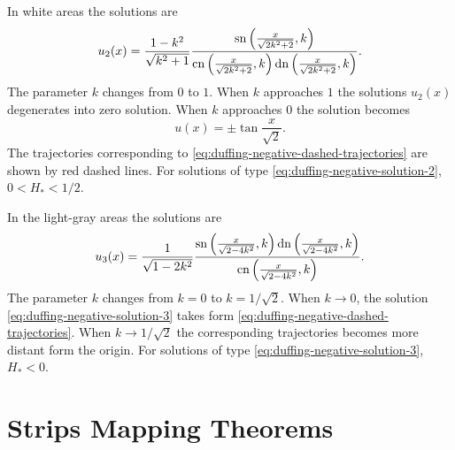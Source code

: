 In white areas the solutions are
\begin{equation}
	u_2(x) = \frac{1 - k^2}{\sqrt{k^2 + 1}} \frac{\mathop\mathrm{sn} \left( \frac{x}{\sqrt{2k^2 + 2}}, k \right)}{\mathrm{cn} \left( \frac{x}{\sqrt{2k^2 + 2}}, k \right) \mathop\mathrm{dn} \left( \frac{x}{\sqrt{2k^2 + 2}}, k \right)}.
\label{eq:duffing-negative-solution-2}
\end{equation}
The parameter $k$ changes from $0$ to $1$.
When $k$ approaches $1$ the solutions $u_2(x)$ degenerates into zero solution.
When $k$ approaches $0$ the solution becomes
\begin{equation}
	u(x) = \pm \tan \frac{x}{\sqrt{2}}.
\label{eq:duffing-negative-dashed-trajectories}
\end{equation}
The trajectories corresponding to \eqref{eq:duffing-negative-dashed-trajectories} are shown by red dashed lines.
For solutions of type \eqref{eq:duffing-negative-solution-2}, $0 < H_* < 1/2$.

In the light-gray areas the solutions are
\begin{equation}
	u_3(x) = \frac{1}{\sqrt{1 - 2k^2}} \frac{\mathop\mathrm{sn} \left( \frac{x}{\sqrt{2 - 4k^2}}, k \right) \mathop\mathrm{dn} \left( \frac{x}{\sqrt{2 - 4k^2}}, k \right)}{\mathrm{cn} \left( \frac{x}{\sqrt{2 - 4k^2}}, k \right)}.
\label{eq:duffing-negative-solution-3}
\end{equation}
The parameter $k$ changes from $k = 0$ to $k = 1 / \sqrt{2}$.
When $k \to 0$, the solution \eqref{eq:duffing-negative-solution-3} takes form \eqref{eq:duffing-negative-dashed-trajectories}.
When $k \to 1 / \sqrt{2}$ the corresponding trajectories becomes more distant form the origin.
For solutions of type \eqref{eq:duffing-negative-solution-3}, $H_* < 0$.

\chapter{Strips Mapping Theorems}
\label{appendix:strips-mapping-theorems}

